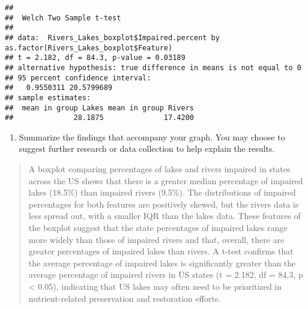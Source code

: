 \documentclass[]{article}
\newenvironment{Shaded}{\begin{snugshade}}{\end{snugshade}}
\newcommand{\DataTypeTok}[1]{\textcolor[rgb]{0.13,0.29,0.53}{#1}}
\newcommand{\KeywordTok}[1]{\textcolor[rgb]{0.13,0.29,0.53}{\textbf{#1}}}
\newcommand{\NormalTok}[1]{#1}
\newcommand{\OperatorTok}[1]{\textcolor[rgb]{0.81,0.36,0.00}{\textbf{#1}}}
\newcommand{\OtherTok}[1]{\textcolor[rgb]{0.56,0.35,0.01}{#1}}
\newcommand{\StringTok}[1]{\textcolor[rgb]{0.31,0.60,0.02}{#1}}
\providecommand{\tightlist}{%
  \setlength{\itemsep}{0pt}\setlength{\parskip}{0pt}}
\begin{document}
\begin{Shaded}
\end{Shaded}

\begin{verbatim}
## 
##  Welch Two Sample t-test
## 
## data:  Rivers_Lakes_boxplot$Impaired.percent by as.factor(Rivers_Lakes_boxplot$Feature)
## t = 2.182, df = 84.3, p-value = 0.03189
## alternative hypothesis: true difference in means is not equal to 0
## 95 percent confidence interval:
##   0.9550311 20.5799689
## sample estimates:
##  mean in group Lakes mean in group Rivers 
##              28.1875              17.4200
\end{verbatim}

\begin{enumerate}
\def\labelenumi{\arabic{enumi}.}
\setcounter{enumi}{11}
\tightlist
\item
  Summarize the findings that accompany your graph. You may choose to
  suggest further research or data collection to help explain the
  results.
\end{enumerate}

\begin{quote}
A boxplot comparing percentages of lakes and rivers impaired in states
across the US shows that there is a greater median percentage of
impaired lakes (18.5\%) than impaired rivers (9.5\%). The distributions
of impaired percentages for both features are positively skewed, but the
rivers data is less spread out, with a smaller IQR than the lakes data.
These features of the boxplot suggest that the state percentages of
impaired lakes range more widely than those of impaired rivers and that,
overall, there are greater percentages of impaired lakes than rivers. A
t-test confirms that the average percentage of impaired lakes is
significantly greater than the average percentage of impaired rivers in
US states (t = 2.182, df = 84.3, p \textless{} 0.05), indicating that US
lakes may often need to be prioritized in nutrient-related preservation
and restoration efforts.
\end{quote}
\end{document}
